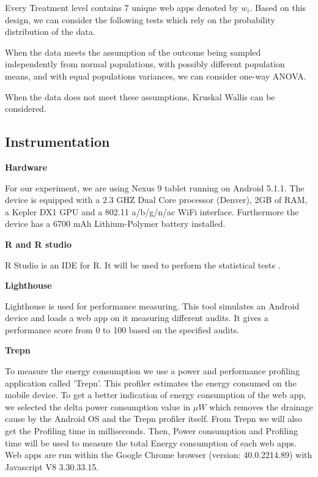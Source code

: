 Every Treatment level contains 7 unique web apps denoted by $w_i$. Based on this design, we can consider the following tests which rely on the probability distribution of the data.


When the data meets the assumption of the outcome being sampled independently from normal populations, with possibly different population means, and with equal populations variances, we can consider one-way ANOVA. 

When the data does not meet these assumptions, Kruskal Wallis can be considered. \newline

	
\subsection{Instrumentation}

\textbf{Hardware}

For our experiment, we are using Nexus 9 tablet running on Android 5.1.1. The device is equipped with a 2.3 GHZ Dual Core processor (Denver), 2GB of RAM, a Kepler DX1 GPU and a 802.11 a/b/g/n/ac WiFi interface. Furthermore the device has a 6700 mAh Lithium-Polymer battery installed. \newline

\textbf{R and R studio}

R Studio is an IDE for R. It will be used to perform the statistical tests \cite{WEBSITE:14}. \newline

\textbf{Lighthouse}

Lighthouse is used for performance measuring. This tool simulates an Android device and loads a web app on it measuring different audits. It gives a performance score from 0 to 100 based on the specified audits.
 \newpage

\textbf{Trepn}

To measure the energy consumption we use a power and performance profiling application called 'Trepn'. This profiler estimates the energy consumed on the mobile device. To get a better indication of energy consumption of the web app, we selected the delta power consumption value in $\mu W$ which removes the drainage cause by the Android OS and the Trepn profiler itself. From Trepn we will also get the Profiling time in milliseconds. Then, Power consumption and Profiling time will be used to measure the total Energy consumption of each web apps. Web apps are run within the Google Chrome browser (version: 40.0.2214.89) with Javascript V8 3.30.33.15. \newline

